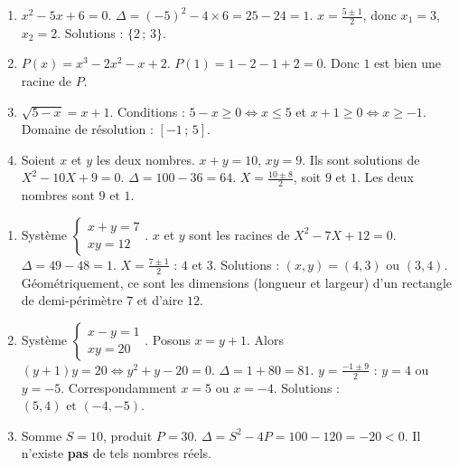 \documentclass[11pt]{article}
\begin{document}
\begin{corrige}
\begin{enumerate}
\item $x^2 - 5x + 6 = 0$. $\Delta = (-5)^2 - 4\times 6 = 25-24=1$. $x = \frac{5 \pm 1}{2}$, donc $x_1 = 3$, $x_2 = 2$. Solutions : $\boxed{\{2\,;\,3\}}$.
\item $P(x)=x^3-2x^2-x+2$. $P(1)=1-2-1+2=0$. Donc $1$ est bien une racine de $P$.
\item $\sqrt{5-x}=x+1$. Conditions : $5-x \ge 0 \iff x \le 5$ et $x+1 \ge 0 \iff x \ge -1$. Domaine de résolution : $\boxed{[-1\,;\,5]}$.
\item Soient $x$ et $y$ les deux nombres. $x+y=10$, $xy=9$. Ils sont solutions de $X^2-10X+9=0$. $\Delta = 100-36=64$. $X = \frac{10 \pm 8}{2}$, soit $9$ et $1$. Les deux nombres sont $\boxed{9 \text{ et } 1}$.
\end{enumerate}
\end{corrige}

\begin{corrige}
\begin{enumerate}
\item Système $\begin{cases} x+y=7 \\ xy=12 \end{cases}$. $x$ et $y$ sont les racines de $X^2-7X+12=0$. $\Delta=49-48=1$. $X=\frac{7\pm1}{2}$ : $4$ et $3$. Solutions : $(x,y)=(4,3)$ ou $(3,4)$. Géométriquement, ce sont les dimensions (longueur et largeur) d'un rectangle de demi-périmètre $7$ et d'aire $12$.
\item Système $\begin{cases} x-y=1 \\ xy=20 \end{cases}$. Posons $x=y+1$. Alors $(y+1)y=20 \iff y^2+y-20=0$. $\Delta=1+80=81$. $y=\frac{-1\pm9}{2}$ : $y=4$ ou $y=-5$. Correspondamment $x=5$ ou $x=-4$. Solutions : $\boxed{(5,4) \text{ et } (-4,-5)}$.
\item Somme $S=10$, produit $P=30$. $\Delta = S^2-4P = 100-120 = -20 < 0$. Il n'existe \textbf{pas} de tels nombres réels.
\end{enumerate}
\end{corrige}
\end{document}
